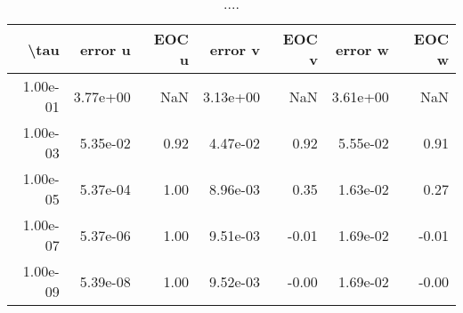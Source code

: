 \begin{table}[ht]
\centering
\begin{tabular}{rrrrrrr}
  \hline
  \textbf{\textbackslash{}tau} & \textbf{error u} & \textbf{EOC u} & \textbf{error v} & \textbf{EOC v} & \textbf{error w} & \textbf{EOC w} \\\hline
  1.00e-01 & 3.77e+00 & NaN & 3.13e+00 & NaN & 3.61e+00 & NaN \\
  1.00e-03 & 5.35e-02 & 0.92 & 4.47e-02 & 0.92 & 5.55e-02 & 0.91 \\
  1.00e-05 & 5.37e-04 & 1.00 & 8.96e-03 & 0.35 & 1.63e-02 & 0.27 \\
  1.00e-07 & 5.37e-06 & 1.00 & 9.51e-03 & -0.01 & 1.69e-02 & -0.01 \\
  1.00e-09 & 5.39e-08 & 1.00 & 9.52e-03 & -0.00 & 1.69e-02 & -0.00 \\\hline
\end{tabular}
\caption{....}
\end{table}
